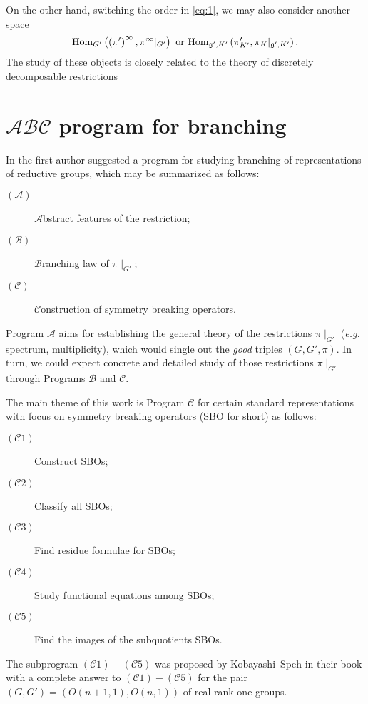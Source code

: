 \documentclass[reqno,12pt]{pja00} %
\newcommand{\Hom}{\mbox{\normalfont Hom}}
\theoremstyle{definition}
\theoremstyle{exampstyle} \newtheorem{examp}[theorem]{Theorem}
\begin{document}
On the other hand, switching the order in \eqref{eq:1}, we may also consider another space
\begin{equation*}
	\Hom_{G'}\left( \left( \pi' \right)^\infty,\pi^\infty\kern-0.1cm\mid_{G'} \right)\mbox{ or }\Hom_{\mathfrak{g}',K'}\left( \pi_{K'}',\pi_{K}\kern-0.1cm\mid_{\mathfrak{g}',K'} \right).
\end{equation*}
The study of these objects is closely related to the theory of discretely decomposable restrictions \cite{kobayashi1998discrete2,kobayashi1998discrete3}

\section{$\mathcal{A}\mathcal{B}\mathcal{C}$ program for branching}

In {\cite{kobayashi2015program}} the first author suggested a program
for studying branching of representations of reductive groups, which may be summarized
as follows:
\begin{description}
  \item[$(\mathcal{A})$] $\mathcal{A}$bstract features of the restriction;
  
  \item[$(\mathcal{B})$] $\mathcal{B}$ranching law of $\pi\!\mid_{G'}$;
  
  \item[$(\mathcal{C})$] $\mathcal{C}$onstruction of symmetry breaking operators.
\end{description}
Program $\mathcal{A}$ aims for establishing the general theory of the restrictions $\pi\!\mid_{G'}$
({\it e.g.} spectrum, multiplicity), which would single out the {\it good} triples $\left( G,G',\pi \right)$. In turn, we could expect concrete and detailed study of those restrictions
$\pi\!\mid_{G'}$ through Programs $\mathcal{B}$ and $\mathcal{C}$.

The main theme of this work is Program ${\mathcal{C}}$ for certain standard
representations with focus on symmetry breaking operators (SBO for short) as follows:
\begin{description}
  \item[$(\mathcal{C}1)$] Construct SBOs;
  \item[$(\mathcal{C}2)$] Classify all SBOs;
  \item[$(\mathcal{C}3)$] Find residue formulae for SBOs;
  \item[$(\mathcal{C}4)$] Study functional equations among SBOs;
  \item[$(\mathcal{C}5)$] Find the images of the subquotients SBOs.
\end{description}
The subprogram $(\mathcal{C}1) - (\mathcal{C}5)$ was proposed by
Kobayashi--Speh in their book {\cite{kobayashi2015symmetry}} with
a complete answer to $(\mathcal{C}1) - (\mathcal{C}5)$ for the
pair $(G, G') = (O (n + 1, 1), O (n, 1))$ of real rank one groups.
\end{document}
